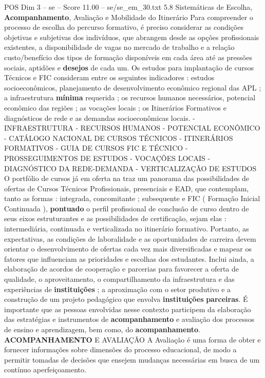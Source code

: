\begin{textsample}{POS Dim 3 – se – Score 11.00 – se/se\_em\_30.txt}  \label{ex:f3_pos_168}
5.8 Sistemáticas de Escolha, \textbf{Acompanhamento}, Avaliação e Mobilidade do Itinerário Para compreender o processo de escolha do percurso formativo, é preciso considerar as condições objetivas e subjetivas dos indivíduos, que abrangem desde as opções profissionais existentes, a disponibilidade de vagas no mercado de trabalho e a relação custo/benefício dos tipos de formação disponíveis em cada área até as pressões sociais, aptidões e \textbf{desejos} de cada um.
Os estudos para implantação de cursos Técnicos e FIC consideram entre os seguintes indicadores : estudos socioeconômicos, planejamento de desenvolvimento econômico regional das APL ; a infraestrutura \textbf{mínima} requerida ; os recursos humanos necessários, potencial econômico das regiões ; as vocações locais ; os Itinerários Formativos e diagnósticos de rede e as demandas socioeconômicas locais. - INFRAESTRUTURA - RECURSOS HUMANOS - POTENCIAL ECONÔMICO - CATÁLOGO NACIONAL DE CURSOS TÉCNICOS - ITINERÁRIOS FORMATIVOS - GUIA DE CURSOS FIC E TÉCNICO - PROSSEGUIMENTOS DE ESTUDOS - VOCAÇÕES LOCAIS - DIAGNÓSTICO DA REDE-DEMANDA - VERTICALIZAÇÃO DE ESTUDOS O portfólio de cursos já em oferta na traz um panorama das possibilidades de ofertas de Cursos Técnicos Profissionais, presenciais e EAD, que contemplam, tanto as formas : integrada, concomitante ; subsequente e FIC ( Formação Inicial Continuada ), \textbf{pontuado} o perfil profissional de conclusão de curso dentro de seus eixos estruturantes e as possibilidades de certificação, sejam elas : intermediária, continuada e verticalizada no itinerário formativo.
Portanto, as expectativas, as condições de laboralidade e as oportunidades de carreira devem orientar o desenvolvimento de ofertas cada vez mais diversificadas e mapear os fatores que influenciam as prioridades e escolhas dos estudantes.
Inclui ainda, a elaboração de acordos de cooperação e parcerias para favorecer a oferta de qualidade, o aproveitamento, o compartilhamento da infraestrutura e das experiências de \textbf{instituições} ; a aproximação com o setor produtivo e a construção de um projeto pedagógico que envolva \textbf{instituições} \textbf{parceiras}.
É importante que as pessoas envolvidas nesse contexto participem da elaboração das estratégias e instrumentos de \textbf{acompanhamento} e avaliação dos processos de ensino e aprendizagem, bem como, do \textbf{acompanhamento}. \textbf{ACOMPANHAMENTO} E AVALIAÇÃO A Avaliação é uma forma de obter e fornecer informações sobre dimensões do processo educacional, de modo a permitir tomadas de decisões que ensejem mudanças necessárias em busca de um contínuo aperfeiçoamento.

\end{textsample}
